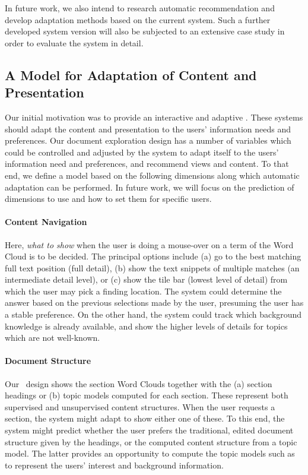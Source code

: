 In future work, we also intend to research automatic recommendation and develop adaptation methods based on the current system. 
%
Such a further developed system version will also be subjected to an extensive case study in order to evaluate the system in detail.


\subsection{A Model for Adaptation of Content and Presentation}

Our initial motivation was to provide an interactive and adaptive \chis. 
%
These systems should adapt the content and presentation to the users' information needs and preferences. 
%
Our document exploration design has a number of variables which could be controlled and adjusted by the system to adapt itself to the users' information need and preferences, and recommend views and content. 
%
To that end, we define a model based on the following dimensions along which automatic adaptation can be performed. 
%
In future work, we will focus on the prediction of dimensions to use and how to set them for specific users.



\paragraph*{Content Navigation} 
Here, \emph{what to show} when the user is doing a mouse-over on a term of the Word Cloud is to be decided. 
%
The principal options include (a) go to the best matching full text position (full detail), (b) show the text snippets of multiple matches (an intermediate detail level), or (c) show the tile bar (lowest level of detail) from which the user may pick a finding location. 
%
The system could determine the answer based on the previous selections made by the user, presuming the user has a stable preference. 
%
On the other hand, the system could track which background knowledge is already available, and show the higher levels of details for topics which are not well-known.


\paragraph*{Document Structure} 
Our \apluschis\ design shows the section Word Clouds together with the (a) section headings or (b) topic models computed for each section. 
%
These represent both supervised and unsupervised content structures. 
%
When the user requests a section, the system might adapt to show either one of these. 
%
To this end, the system might predict whether the user prefers the traditional, edited document structure given by the headings, or the computed content structure from a topic model. 
%
The latter provides an opportunity to compute the topic models such as to represent the users' interest and background information.


